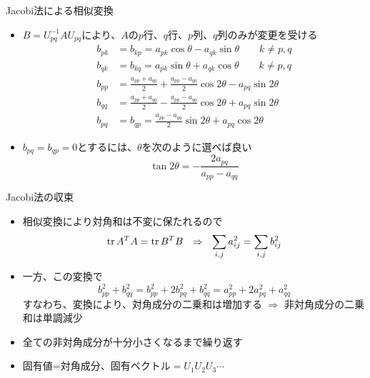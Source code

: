 \begin{frame}[t,fragile]{Jacobi法による相似変換}
  \begin{itemize}
    \setlength{\itemsep}{1em}
  \item $B=U_{pq}^{-1} A U_{pq}$により、$A$の$p$行、$q$行、$p$列、$q$列のみが変更を受ける
    \begin{align*}
      b_{pk} &= b_{kp} = a_{pk} \cos \theta - a_{qk} \sin \theta \qquad k \ne p,q \\
      b_{qk} &= b_{kq} = a_{pk} \sin \theta + a_{qk} \cos \theta \qquad k \ne p,q \\
      b_{pp} &= \frac{a_{pp}+a_{qq}}{2} + \frac{a_{pp}-a_{qq}}{2} \cos 2 \theta - a_{pq} \sin 2 \theta \\
      b_{qq} &= \frac{a_{pp}+a_{qq}}{2} - \frac{a_{pp}-a_{qq}}{2} \cos 2 \theta + a_{pq} \sin 2 \theta \\
      b_{pq} &= b_{qp} = \frac{a_{pp}-a_{qq}}{2} \sin 2 \theta + a_{pq} \cos 2 \theta
    \end{align*}
  \item $b_{pq} = b_{qp} = 0$とするには、$\theta$を次のように選べば良い
    \[
    \tan 2 \theta = - \frac{2 a_{pq}}{a_{pp}-a_{qq}}
    \]
  \end{itemize}
\end{frame}

\begin{frame}[t,fragile]{Jacobi法の収束}
  \begin{itemize}
    \setlength{\itemsep}{1em}
  \item 相似変換により対角和は不変に保たれるので
    \[
      {\rm tr} \, A^T A = {\rm tr} \, B^T B \ \ \Rightarrow \ \
      \sum_{i,j} a_{ij}^2 = \sum_{i,j} b_{ij}^2
    \]
  \item 一方、この変換で
    \[
    b_{pp}^2 + b_{qq}^2 = b_{pp}^2 + 2 b_{pq}^2 + b_{qq}^2 = a_{pp}^2 + 2 a_{pq}^2 + a_{qq}^2
    \]
    すなわち、変換により、対角成分の二乗和は増加する $\Rightarrow$ 非対角成分の二乗和は単調減少
  \item 全ての非対角成分が十分小さくなるまで繰り返す
  \item 固有値=対角成分、固有ベクトル$=U_1 U_2 U_3 \cdots$
  \end{itemize}
\end{frame}

